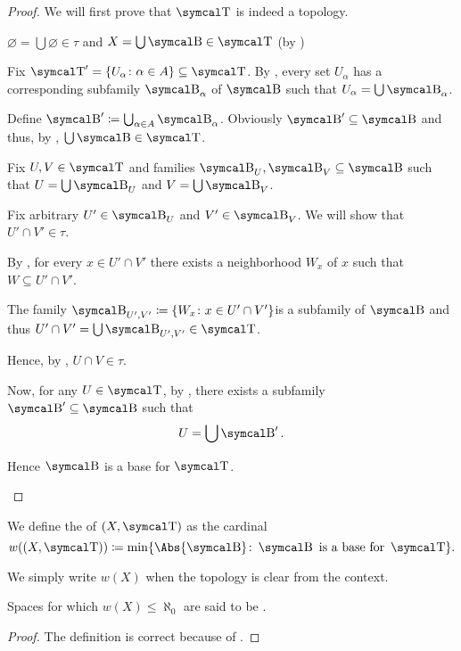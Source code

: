 \begin{proof}
  We will first prove that \( \CT \) is indeed a topology.

  \begin{RefList}
     \( \varnothing = \bigcup \varnothing \in \tau \) and \( X = \bigcup \CB \in \CT \) (by )

     Fix \( \CT' = \{ U_\alpha \colon \alpha \in A \} \subseteq \CT \). By , every set \( U_\alpha \) has a corresponding subfamily \( \CB_\alpha \) of \( \CB \) such that \( U_\alpha = \bigcup \CB_\alpha \).

    Define \( \CB' \coloneqq \bigcup_{\alpha \in A} \CB_\alpha \). Obviously \( \CB' \subseteq \CB \) and thus, by , \( \bigcup \CB \in \CT \).

     Fix \( U, V \in \CT \) and families \( \CB_U, \CB_V \subseteq \CB \) such that \( U = \bigcup \CB_U \) and \( V = \bigcup \CB_V \).

    Fix arbitrary \( U' \in \CB_U \) and \( V' \in \CB_V \). We will show that \( U' \cap V' \in \tau \).

    By , for every \( x \in U' \cap V' \) there exists a neighborhood \( W_x \) of \( x \) such that \( W \subseteq U' \cap V' \).

    The family \( \CB_{U',V'} \coloneqq \{ W_x \colon x \in U' \cap V' \} \)\AOC is a subfamily of \( \CB \) and thus \( U' \cap V' = \bigcup \CB_{U',V'} \in \CT \).

    Hence, by , \( U \cap V \in \tau \).

    Now, for any \( U \in \CT \), by , there exists a subfamily \( \CB' \subseteq \CB \) such that
    \begin{equation*}
      U = \bigcup \CB'.
    \end{equation*}

    Hence \( \CB \) is a base for \( \CT \).
  \end{RefList}
\end{proof}

\begin{definition}\label{def:topological_space_weight}
  We define the  of \( (X, \CT) \) as the cardinal
  \begin{equation*}
    w((X, \CT)) \coloneqq \min \{ \Abs{\CB} \colon \CB \text{ is a base for } \CT \}.
  \end{equation*}

  We simply write \( w(X) \) when the topology is clear from the context.

  Spaces for which \( w(X) \leq \aleph_0 \) are said to be .
\end{definition}
\begin{proof}
  The definition is correct because of .
\end{proof}

